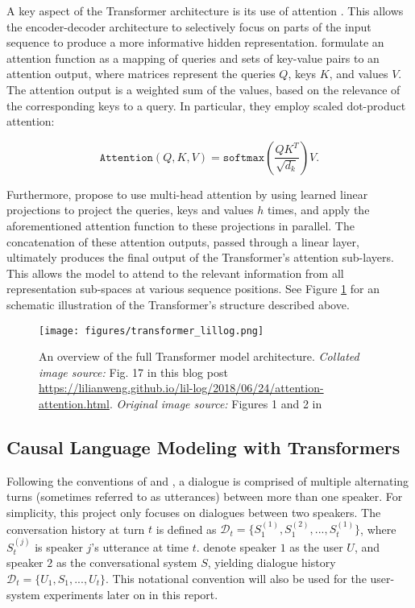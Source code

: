 A key aspect of the Transformer architecture is its use of attention \citep{DBLP:journals/corr/BahdanauCB14}. This allows the encoder-decoder architecture to selectively focus on parts of the input sequence to produce a more informative hidden representation. \citeauthor{vaswani2017attention} formulate an attention function as a mapping of queries and sets of key-value pairs to an attention output, where matrices represent the queries $Q$, keys $K$, and values $V$. The attention output is a weighted sum of the values, based on the relevance of the corresponding keys to a query. In particular, they employ scaled dot-product attention:

\begin{equation}
    \texttt{Attention}(Q, K, V) = \texttt{softmax} \left( \frac{QK^T}{\sqrt{d_k}}\right) V.
\end{equation}

Furthermore, \cite{vaswani2017attention} propose to use multi-head attention by using learned linear projections to project the queries, keys and values $h$ times, and apply the aforementioned attention function to these projections in parallel. The concatenation of these attention outputs, passed through a linear layer, ultimately produces the final output of the Transformer's attention sub-layers. This allows the model to attend to the relevant information from all representation sub-spaces at various sequence positions. See Figure \ref{fig:transformer_architecture} for an schematic illustration of the Transformer's structure described above.


\begin{figure}[H]
    \centering
    \texttt{[image: figures/transformer\_lillog.png]}
    \caption{An overview of the full Transformer model architecture. \textit{Collated image source:} Fig. 17 in this blog post \url{https://lilianweng.github.io/lil-log/2018/06/24/attention-attention.html}. \textit{Original image source:} Figures 1 and 2 in \cite{vaswani2017attention}}
    \label{fig:transformer_architecture}
\end{figure}

\subsection{Causal Language Modeling with Transformers}

Following the conventions of \cite{dathathri2019plug} and \cite{madotto-etal-2020-plug}, a dialogue is comprised of multiple alternating turns (sometimes referred to as utterances) between more than one speaker. For simplicity, this project only focuses on dialogues between two speakers. The conversation history at turn $t$ is defined as $\mathcal{D}_t = \{S^{(1)}_1, S^{(2)}_1, ..., S^{(1)}_t\}$, where $S^{(j)}_t$ is speaker $j$'s utterance at time $t$. \cite{madotto-etal-2020-plug} denote speaker $1$ as the user $U$, and speaker $2$ as the conversational system $S$, yielding dialogue history $\mathcal{D}_t = \{U_1, S_1, ..., U_t\}$. This notational convention will also be used for the user-system experiments later on in this report.

